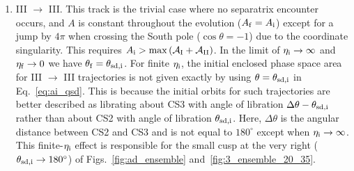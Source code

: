 \documentclass[twocolumn,twocolappendix]{aastex63}
\newcommand*{\p}[1]{\left(#1\right)}
\begin{document}
\begin{enumerate}
    \item III $\to$ III\@. This track is the trivial case where no separatrix
        encounter occurs, and $A$ is constant throughout the evolution ($A_{\rm
        f} = A_{\rm i}$) except for a jump by $4\pi$ when crossing the South
        pole ($\cos \theta = -1$) due to the coordinate singularity. This
        requires $A_{\rm i} > \max \p{\mathcal{A}_{\rm I} + \mathcal{A}_{\rm
        II}}$. In the limit of $\eta_{\rm i} \to \infty$ and $ \eta_{\rm f} \to
        0$ we have $\theta_{\rm f} = \theta_{\rm sd, i}$. For finite $\eta_{\rm
        i}$, the initial enclosed phase space area for III $\to$ III
        trajectories is not given exactly by using $\theta = \theta_{\rm sd, i}$
        in Eq.~\eqref{eq:ai_qsd}. This is because the initial orbits for such
        trajectories are better described as librating about CS3 with angle of
        libration $\Delta \theta - \theta_{\rm sd, i}$ rather than about CS2
        with angle of libration $\theta_{\rm sd, i}$. Here, $\Delta \theta$ is
        the angular distance between CS2 and CS3 and is not equal to $180^\circ$
        except when $\eta_{\rm i} \to \infty$. This finite-$\eta_{\rm i}$ effect
        is responsible for the small cusp at the very right ($\theta_{\rm sd, i}
        \to 180^\circ$) of Figs.~\ref{fig:ad_ensemble}
        and~\ref{fig:3_ensemble_20_35}.
\end{enumerate}
\end{document}
